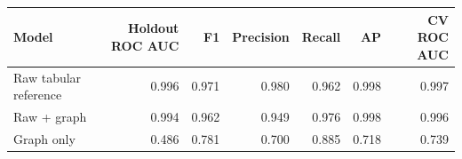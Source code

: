 \begin{tabular}{lrrrrrr}
\toprule
Model & Holdout ROC AUC & F1 & Precision & Recall & AP & CV ROC AUC \\
\midrule
Raw tabular reference & 0.996 & 0.971 & 0.980 & 0.962 & 0.998 & 0.997 \\
Raw + graph & 0.994 & 0.962 & 0.949 & 0.976 & 0.998 & 0.996 \\
Graph only & 0.486 & 0.781 & 0.700 & 0.885 & 0.718 & 0.739 \\
\bottomrule
\end{tabular}
